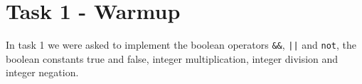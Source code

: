 \documentclass[11pt]{article}
\begin{document}

    \clearpage
    \maketitle
    \thispagestyle{empty}

    \newpage


    \section{Task 1 - Warmup}
    In task 1 we were asked to implement the boolean operators \texttt{\&\&},
    \texttt{||} and \texttt{not}, the boolean constants true and false, integer
    multiplication, integer division and integer negation. \\
\end{document}
